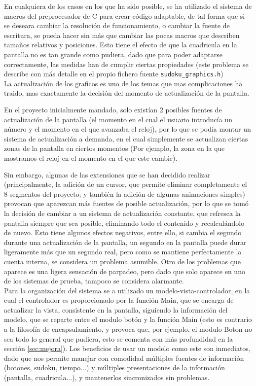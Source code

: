 \documentclass[12pt,letterpaper]{article}
\begin{document}
En cualquiera de los casos en los que ha sido posible, se ha utilizado
el sistema de macros del preprocesador de C para crear código
adaptable, de tal forma que si se deseara cambiar la resolución de
funcionamiento, o cambiar la fuente de escritura, se pueda hacer sin
más que cambiar las pocas macros que describen tamaños relativos y
posiciones. Esto tiene el efecto de que la cuadricula en la pantalla
no es tan grande como pudiera, dado que para poder adaptarse
correctamente, las medidas han de cumplir ciertas propiedades (este
problema se describe con más detalle en el propio fichero fuente
\texttt{sudoku\_graphics.h})\\

La actualización de los graficos es uno de los temas que mas
complicaciones ha traido, mas exactamente la decisión del momento de
actualización de la pantalla.

En el proyecto inicialmente mandado, solo existían 2 posibles fuentes
de actualización de la pantalla (el momento en el cual el usuario
introducía un número y el momento en el que avanzaba el reloj), por lo
que se podía montar un sistema de actualización a demanda, en el cual
simplemente se actualizan ciertas zonas de la pantalla en ciertos
momentos (Por ejemplo, la zona en la que mostramos el reloj en el
momento en el que este cambie).

Sin embargo, algunas de las extensiones que se han decidido realizar
(principalmente, la adición de un cursor, que permite eliminar
completamente el 8 segmentos del proyecto; y también la adición de
algunas animaciones simples) provocan que aparezcan más fuentes de
posible actualización, por lo que se tomó la decisión de cambiar a un
sistema de actualización constante, que refresca la pantalla siempre
que sea posible, eliminando todo el contenido y recalculándolo de
nuevo. Esto tiene algunos efectos negativos, entre ello, si cambia el
segundo durante una actualización de la pantalla, un segundo en la
pantalla puede durar ligeramente más que un segundo real, pero como se
mantiene perfectamente la cuenta interna, se considera un problema
asumible. Otro de los problemas que aparece es una ligera sensación de
parpadeo, pero dado que solo aparece en uno de los sistemas de prueba,
tampoco se considera alarmante.\\

Para la organización del sistema se a utilizado un
modelo-vista-controlador, en la cual el controlador es proporcionado
por la función Main, que se encarga de actualizar la vista,
consistente en la pantalla, siguiendo la información del modelo, que
se reparte entre el modulo botón y la función Main (esto es contrario
a la filosofía de encapsulamiento, y provoca que, por ejemplo, el
modulo Boton no sea todo lo general que pudiera, esto se comenta con
más profundidad en la sección \ref{sec:mejora}). Los beneficios de
usar un modelo como este son inmediatos, dado que nos permite manejar
con comodidad múltiples fuentes de información (botones, sudoku,
tiempo...) y múltiples presentaciones de la información (pantalla,
cuadricula...), y mantenerlos sincronizados sin problemas.
\end{document}
